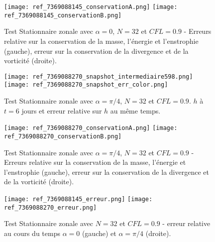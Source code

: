 \begin{figure}[ht]
\begin{center}
\texttt{[image: ref\_7369088145\_conservationA.png]}
\texttt{[image: ref\_7369088145\_conservationB.png]}
\end{center}
\caption{Test Stationnaire zonale \cite{Williamson1992} avec $\alpha=0$, $N=32$ et $CFL=0.9$ - Erreurs relative sur la conservation de la masse, l'énergie et l'enstrophie (gauche), erreur sur la conservation de la divergence et de la vorticité (droite).}
\label{fig: williamson 2 conservation alpha=0}
\end{figure}




\begin{figure}[ht]
\begin{center}
\texttt{[image: ref\_7369088270\_snapshot\_intermediaire598.png]}\\
\texttt{[image: ref\_7369088270\_snapshot\_err\_color.png]}
\end{center}
\caption{Test Stationnaire zonale \cite{Williamson1992} avec $\alpha=\pi/4$, $N=32$ et $CFL=0.9$. $h$ à $t=6$ jours et erreur relative sur $h$ au même temps.}
\label{fig: williamson 2 space alpha=pi/4}
\end{figure}

\begin{figure}[ht]
\begin{center}
\texttt{[image: ref\_7369088270\_conservationA.png]}
\texttt{[image: ref\_7369088270\_conservationB.png]}
\end{center}
\caption{Test Stationnaire zonale \cite{Williamson1992} avec $\alpha=\pi/4$, $N=32$ et $CFL=0.9$ - Erreurs relative sur la conservation de la masse, l'énergie et l'enstrophie (gauche), erreur sur la conservation de la divergence et de la vorticité (droite).}
\label{fig: williamson 2 conservation alpha=pi/4}
\end{figure}

\begin{figure}[ht]
\begin{center}
\texttt{[image: ref\_7369088145\_erreur.png]}
\texttt{[image: ref\_7369088270\_erreur.png]}
\end{center}
\caption{Test Stationnaire zonale \cite{Williamson1992} avec $N=32$ et $CFL=0.9$ - erreur relative au cours du temps $\alpha = 0$ (gauche) et $\alpha = \pi/4$ (droite).}
\label{fig: williamson 2 erreur}
\end{figure}

















